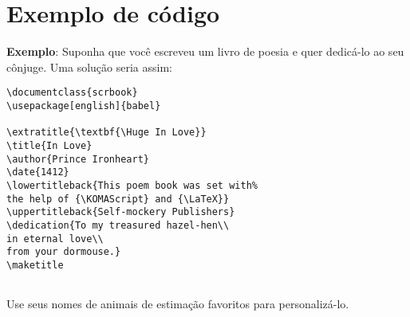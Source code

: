 \chapter{Exemplo de código}
\textbf{Exemplo}: Suponha que você escreveu um livro de poesia e quer dedicá-lo ao seu cônjuge. Uma solução seria assim:
\begin{verbatim}
\documentclass{scrbook}
\usepackage[english]{babel}

\extratitle{\textbf{\Huge In Love}}
\title{In Love}
\author{Prince Ironheart}
\date{1412}
\lowertitleback{This poem book was set with%
the help of {\KOMAScript} and {\LaTeX}}
\uppertitleback{Self-mockery Publishers}
\dedication{To my treasured hazel-hen\\
in eternal love\\
from your dormouse.}
\maketitle
 
\end{verbatim}

Use seus nomes de animais de estimação favoritos para personalizá-lo.